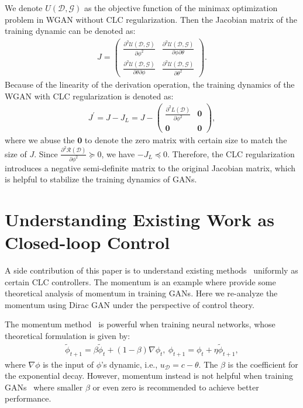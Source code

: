 \documentclass{article}
\newcommand{\xG}{\mathcal{G}}
\newcommand{\xD}{\mathcal{D}}
\newcommand{\uU}{\mathcal{U}}
\newcommand{\uR}{\mathcal{R}}
\theoremstyle{definition}
\begin{document}
We denote $U(\xD, \xG)$ as the objective function of the minimax optimization problem in WGAN without CLC regularization. Then the Jacobian matrix of the training dynamic can be denoted as:
\begin{align}
    J = \begin{pmatrix} \frac{\partial^2 \uU(\xD, \xG)}{\partial \phi^2} & \frac{\partial^2 \uU(\xD, \xG)}{\partial\phi\partial\theta} \\
    \frac{\partial^2 \uU(\xD, \xG)}{\partial\theta\partial\phi} & \frac{\partial^2 \uU(\xD, \xG)}{\partial \theta^2}
    \end{pmatrix}.
\end{align}
Because of the linearity of the derivation operation, the training dynamics of the WGAN with CLC regularization is denoted as:
\begin{align}
    J^\prime = J-J_L = J - \begin{pmatrix} \frac{\partial^2 L(\xD)}{\partial \phi^2} & \mathbf{0} \\
    \mathbf{0} & \mathbf{0}
    \end{pmatrix},
\end{align}
where we abuse the $\mathbf{0}$ to denote the zero matrix with certain size to match the size of $J$.
Since $\frac{\partial^2 \uR(\xD)}{\partial\phi^2}\succeq 0$, we have $-J_L\preceq 0$. Therefore, the CLC regularization introduces a negative semi-definite matrix to the original Jacobian matrix, which is helpful to stabilize the training dynamics of GANs.


\section{Understanding Existing Work as Closed-loop Control}


A side contribution of this paper is to understand existing methods~\cite{gidel2018negative} uniformly as certain CLC controllers.
The momentum is an example where \citet{gidel2018negative} provide some theoretical analysis of momentum in training GANs. Here we re-analyze the momentum using Dirac GAN under the perspective of control theory. 

The momentum method~\citep{qian1999momentum} is powerful when training neural networks, whose theoretical formulation is given by:
\begin{align}
\tilde{\phi}_{t+1} = \beta \tilde{\phi}_t + (1 - \beta) \nabla \phi_t,~\phi_{t+1} = \phi_t + \eta \tilde{\phi}_{t+1},
\label{eqn:momentum_theory}
\end{align}
where $\nabla\phi$ is the input of $\phi$'s dynamic, i.e., $u_\xD = c-\theta$.
The $\beta$ is the coefficient for the exponential decay.
However, momentum instead is not helpful when training GANs~\cite{radford2015unsupervised,mescheder2018training,brock2018large,gulrajani2017improved} where smaller $\beta$ or even zero is recommended to achieve better performance.
\end{document}
